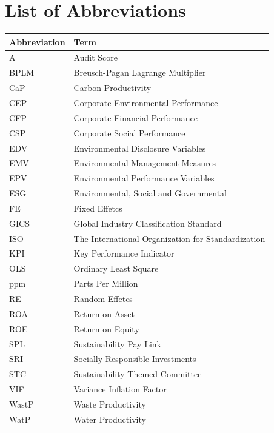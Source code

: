 \documentclass[12pt,]{article}
\begin{document}
\newpage

\renewcommand{\contentsname}{Table of Contents}

\setcounter{tocdepth}{3} \tableofcontents

\newpage


\listoftables
{} \listoffigures

\newpage

\section*{List of Abbreviations}\label{list-of-abbreviations}

\vspace{2cm}

\begin{table}[H]
\centering
\begin{tabular}{ll}
\toprule
Abbreviation & Term\\
\midrule
A & Audit Score\\
BPLM & Breusch-Pagan Lagrange Multiplier\\
CaP & Carbon Productivity\\
CEP & Corporate Environmental Performance\\
CFP & Corporate Financial Performance\\
\addlinespace
CSP & Corporate Social Performance\\
EDV & Environmental Disclosure Variables\\
EMV & Environmental Management Measures\\
EPV & Environmental Performance Variables\\
ESG & Environmental, Social and Governmental\\
\addlinespace
FE & Fixed Effetcs\\
GICS & Global Industry Classification Standard\\
ISO & The International Organization for Standardization\\
KPI & Key Performance Indicator\\
OLS & Ordinary Least Square\\
\addlinespace
ppm & Parts Per Million\\
RE & Random Effetcs\\
ROA & Return on Asset\\
ROE & Return on Equity\\
SPL & Sustainability Pay Link\\
\addlinespace
SRI & Socially Responsible Investments\\
STC & Sustainability Themed Committee\\
VIF & Variance Inflation Factor\\
WastP & Waste Productivity\\
WatP & Water Productivity\\
\bottomrule
\end{tabular}
\end{table}
\end{document}
